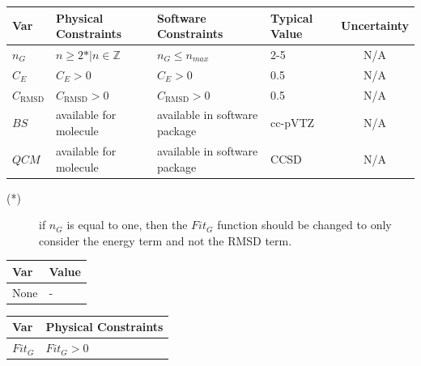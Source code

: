 \documentclass[12pt]{article}
\begin{document}
\begin{table}[!h]
  \caption{Input Variables} \label{TblInputVar}
  \renewcommand{\arraystretch}{1.2}
\noindent \begin{longtable*}{l l l l c} 
  \toprule
  \textbf{Var} & \textbf{Physical Constraints} & \textbf{Software Constraints} &
                             \textbf{Typical Value} & \textbf{Uncertainty}\\
  \midrule 
  $n_G$ & $n\geq 2\text{*} | n\in{\mathbb{Z}}$ & $n_G \leq n_{max}$ & 2-5 & N/A 
  \\
  $C_E$ & $C_E > 0$ & $C_E > 0$ & 0.5 & N/A \\
  $C_\text{RMSD}$ & $C_\text{RMSD} > 0$ & $C_\text{RMSD} > 0$ & 0.5 & N/A \\
  $BS$ & available for molecule & available in software package & cc-pVTZ & N/A 
  \\
  $QCM$& available for molecule & available in software package & CCSD & N/A \\
  \bottomrule
\end{longtable*}
\end{table}

\noindent 
\begin{description}
\item[(*)] if $n_G$ is equal to one, then the $Fit_G$ function should be 
changed to only consider the energy term and not the RMSD term. 
\end{description}

\begin{table}[!h]
\caption{Specification Parameter Values} \label{TblSpecParams}
\renewcommand{\arraystretch}{1.2}
\noindent \begin{longtable*}{l l} 
  \toprule
  \textbf{Var} & \textbf{Value} \\
  \midrule 
  None & - \\
  \bottomrule
\end{longtable*}
\end{table}

\begin{table}[!h]
\caption{Output Variables} \label{TblOutputVar}
\renewcommand{\arraystretch}{1.2}
\noindent \begin{longtable*}{l l} 
  \toprule
  \textbf{Var} & \textbf{Physical Constraints} \\
  \midrule 
  $Fit_G$ & $Fit_G > 0$
  \\
  \bottomrule
\end{longtable*}
\end{table}
\end{document}
